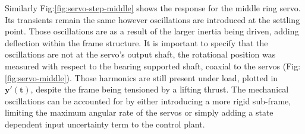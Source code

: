 \par
Similarly Fig:\ref{fig:servo-step-middle} shows the response for the middle ring servo. Its transients remain the same however oscillations are introduced at the settling point. Those oscillations are as a result of the larger inertia being driven, adding deflection within the frame structure. It is important to specify that the oscillations are not at the servo's output shaft, the rotational position was measured with respect to the bearing supported shaft, coaxial to the servos (Fig:\ref{fig:servo-middle}). Those harmonics are still present under load, plotted in {\color{Red}$\mathbf{y'(t)}$}, despite the frame being tensioned by a lifting thrust. The mechanical oscillations can be accounted for by either introducing a more rigid sub-frame, limiting the maximum angular rate of the servos or simply adding a state dependent input uncertainty term to the control plant.
